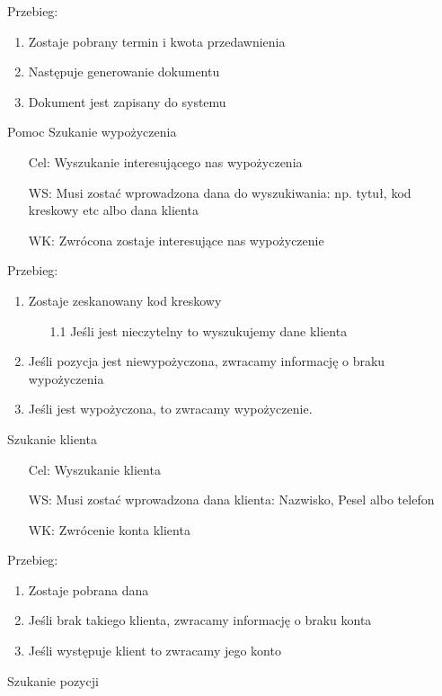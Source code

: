 \documentclass{article}
\begin{document}
	Przebieg:\newline
	\begin{enumerate}
	\item Zostaje pobrany termin i kwota przedawnienia 
		\item Następuje generowanie dokumentu
		\item Dokument jest zapisany do systemu
	\end{enumerate}
\LARGE	Pomoc\newline
\Large	Szukanie wypożyczenia\newline
\normalsize
\begin{enumerate}
	\item[Cel:] Wyszukanie interesującego nas wypożyczenia
	\item[WS:] Musi zostać wprowadzona dana do wyszukiwania: np. tytuł, kod kreskowy etc albo dana klienta
	\item[WK:] Zwrócona zostaje interesujące nas wypożyczenie
\end{enumerate}
Przebieg:
\begin{enumerate}
	\item Zostaje zeskanowany kod kreskowy 
	\begin{enumerate}
		\item [1.1] Jeśli jest nieczytelny to wyszukujemy dane klienta
	\end{enumerate}
	\item Jeśli pozycja jest niewypożyczona, zwracamy informację o braku wypożyczenia
	\item Jeśli jest wypożyczona, to zwracamy wypożyczenie.
\end{enumerate}
	\Large	Szukanie klienta\newline
	\normalsize
	\begin{enumerate}
		\item[Cel:] Wyszukanie klienta
		\item[WS:] Musi zostać wprowadzona dana klienta: Nazwisko, Pesel albo telefon
		\item[WK:] Zwrócenie konta klienta
	\end{enumerate}
	Przebieg:
	\begin{enumerate}
		\item Zostaje pobrana dana
		\item Jeśli brak takiego klienta, zwracamy informację o braku konta
		\item Jeśli występuje klient to zwracamy jego konto
	\end{enumerate}
		\Large	Szukanie pozycji\newline
\end{document}
